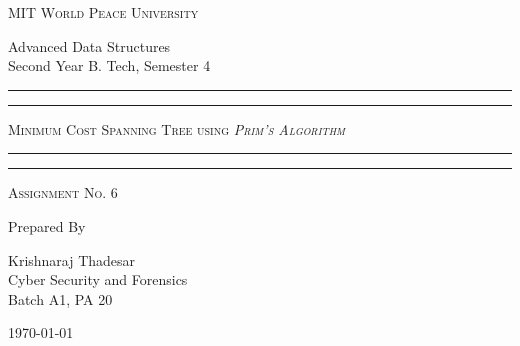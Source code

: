 \documentclass[11pt]{article}
\begin{document}
\begin{titlepage}
    \centering


    \huge\textsc{
        MIT World Peace University
    }\\

    \vspace{0.75\baselineskip} %

    \LARGE{
        Advanced Data Structures\\
        Second Year B. Tech, Semester 4
    }

    \vfill %


    \rule{\textwidth}{1.6pt}\vspace*{-\baselineskip}\vspace*{2pt}
    \rule{\textwidth}{0.6pt}
    \vspace{0.75\baselineskip} %



    \huge{\textsc{
            Minimum Cost Spanning Tree using
            \textit{Prim's Algorithm}
        }} \\



    \vspace{0.5\baselineskip} %
    \rule{\textwidth}{0.6pt}\vspace*{-\baselineskip}\vspace*{2.8pt}
    \rule{\textwidth}{1.6pt}

    \vspace{1\baselineskip} %


    \LARGE\textsc{
        Assignment No. 6
    } %
    \vfill


    Prepared By
    \vspace{0.5\baselineskip} %

    \Large{
        Krishnaraj Thadesar \\
        Cyber Security and Forensics\\
        Batch A1, PA 20
    }


    \vspace{0.5\baselineskip} %
    \today

\end{titlepage}
\end{document}
